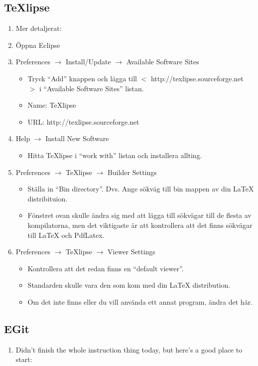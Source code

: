 \documentclass[11pt]{amsart}
\begin{document}
\subsection{TeXlipse}
\begin{enumerate}

\item[] Mer detaljerat: {} \\

\item \"{O}ppna Eclipse  

\item Preferences $\rightarrow$ Install/Update $\rightarrow$ Available Software Sites
	\begin{itemize}
	\item Tryck ``Add'' knappen och l\"{a}gga till $<$ http://texlipse.sourceforge.net $>$ i ``Available Software Sites'' listan. 
	\item Name: TeXlipse 
	\item URL: http://texlipse.sourceforge.net
	\end{itemize}

\item Help $\rightarrow$ Install New Software
	\begin{itemize}
	\item Hitta TeXlipse i ``work with'' listan och installera allting.
	\end{itemize}
	
\item Preferences $\rightarrow$ TeXlipse $\rightarrow$ Builder Settings
	\begin{itemize}
	\item St\"{a}lla in ``Bin directory''. Dvs. Ange s\"{o}kv\"{a}g till bin mappen av din LaTeX distribituion. 
	\item F\"{o}nstret ovan skulle \"{a}ndra sig med att l\"{a}gga till s\"{o}kv\"{a}gar till de flesta av kompilatorna, men det viktigaste \"{a}r att kontrollera att det finns s\"{o}kv\"{a}gar till LaTeX och PdfLatex. 
	\end{itemize}
	
\item Preferences $\rightarrow$ TeXlipse $\rightarrow$ Viewer Settings
	\begin{itemize}
	\item Kontrollera att det redan finns en ``default viewer''.
	\item Standarden skulle vara den som kom med din LaTeX distribution.
	\item Om det inte finns eller du vill anv\"{a}nda ett annat program, \"{a}ndra det h\"{a}r.
	\end{itemize}

\end{enumerate}

\subsection{EGit}
\begin{enumerate}
\item[] Didn't finish the whole instruction thing today, but here's a good place to start:  
{}
\end{enumerate}
\end{document}
